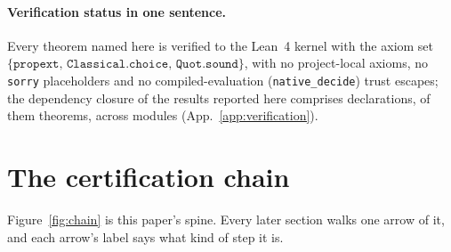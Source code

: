 \documentclass[aps,pra,reprint,nofootinbib,superscriptaddress]{revtex4-2}
\theoremstyle{plain}
\theoremstyle{definition}
\theoremstyle{remark}
\begin{document}
\paragraph*{Verification status in one sentence.} Every theorem named
here is verified to the Lean~4 kernel with the axiom set
$\{\texttt{propext},\,\texttt{Classical.choice},\,\texttt{Quot.sound}\}$,
with no project-local axioms, no \texttt{sorry} placeholders and no
compiled-evaluation (\texttt{native\_decide}) trust escapes; the
dependency closure of the results reported here comprises
\bundleDecls{} declarations, \bundleTheorems{} of them theorems, across
\bundleModules{} modules (App.~\ref{app:verification}).

\section{The certification chain}
\label{sec:chain}

Figure~\ref{fig:chain} is this paper's spine. Every later section walks
one arrow of it, and each arrow's label says what kind of step it is.
\end{document}
